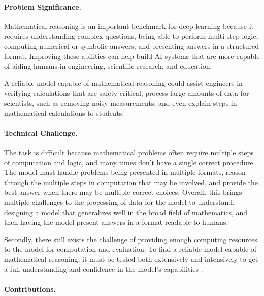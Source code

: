 \documentclass{article}
\begin{document}
\paragraph{Problem Significance.}

Mathematical reasoning is an important benchmark for deep learning because it requires understanding complex questions, being able to perform multi-step logic, computing numerical or symbolic answers, and presenting answers in a structured format. Improving these abilities can help build AI systems that are more capable of aiding humans in engineering, scientific research, and education. 

A reliable model capable of mathematical reasoning could assist engineers in verifying calculations that are safety-critical, process large amounts of data for scientists, such as removing noisy measurements, and even explain steps in mathematical calculations to students. 

\paragraph{Technical Challenge.}

The task is difficult because mathematical problems often require multiple steps of computation and logic, and many times don't have a single correct procedure. The model must handle problems being presented in multiple formats, reason through the multiple steps in computation that may be involved, and provide the best answer when there may be multiple correct choices. Overall, this brings multiple challenges to the processing of data for the model to understand, designing a model that generalizes well in the broad field of mathematics, and then having the model present answers in a format readable to humans. 

Secondly, there still exists the challenge of providing enough computing resources to the model for computation and evaluation. To find a reliable model capable of mathematical reasoning, it must be tested both extensively and intensively to get a full understanding and confidence in the model's capabilities
. 

\paragraph{Contributions.}

\end{document}
